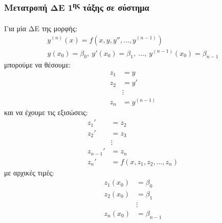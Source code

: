 \documentclass[11pt,a4paper,notitlepage,fleqn]{article}
\begin{document}
\subsubsection{Μετατροπή ΔΕ 1\textsuperscript{ης} τάξης σε σύστημα}

\paragraph{}
Για μία ΔΕ της μορφής:
\begin{gather*}
	y^{(n)}(x) = f\left(x,y,y'',\dots,y^{(n-1)}\right) \\
	y(x_0) = \beta_0,\ y'(x_0)=\beta_1,\ \dots,\ y^{(n-1)}(x_0)=
	\beta_{n-1}
\end{gather*}
μπορούμε να θέσουμε:
\begin{align*}
	z_1 &= y \\
	z_2 &= y' \\
	&\vdots \\
	z_n &= y^{(n-1)}
\end{align*}
και να έχουμε τις εξισώσεις:
\begin{align*}
	z_1' &= z_2 \\
	z_2' &= z_3 \\
	&\vdots \\
	z_{n-1}' &= z_n \\[3ex]
	z_n' &= f(x,z_1,z_2,\dots,z_n)
\end{align*}
με αρχικές τιμές:
\begin{align*}
	z_1(x_0) &= \beta_0 \\
	z_2(x_0) &= \beta_1 \\
	&\vdots \\
	z_n(x_0) &= \beta_{n-1}
\end{align*}
\end{document}
